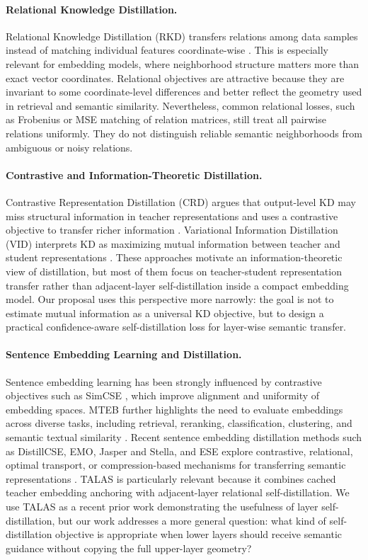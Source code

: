 \documentclass[letterpaper]{article}
\begin{document}
\paragraph{Relational Knowledge Distillation.}
Relational Knowledge Distillation (RKD) transfers relations among data samples instead of matching individual features coordinate-wise \cite{park2019relational}. This is especially relevant for embedding models, where neighborhood structure matters more than exact vector coordinates. Relational objectives are attractive because they are invariant to some coordinate-level differences and better reflect the geometry used in retrieval and semantic similarity. Nevertheless, common relational losses, such as Frobenius or MSE matching of relation matrices, still treat all pairwise relations uniformly. They do not distinguish reliable semantic neighborhoods from ambiguous or noisy relations.

\paragraph{Contrastive and Information-Theoretic Distillation.}
Contrastive Representation Distillation (CRD) argues that output-level KD may miss structural information in teacher representations and uses a contrastive objective to transfer richer information \cite{tian2019crd}. Variational Information Distillation (VID) interprets KD as maximizing mutual information between teacher and student representations \cite{ahn2019vid}. These approaches motivate an information-theoretic view of distillation, but most of them focus on teacher-student representation transfer rather than adjacent-layer self-distillation inside a compact embedding model. Our proposal uses this perspective more narrowly: the goal is not to estimate mutual information as a universal KD objective, but to design a practical confidence-aware self-distillation loss for layer-wise semantic transfer.

\paragraph{Sentence Embedding Learning and Distillation.}
Sentence embedding learning has been strongly influenced by contrastive objectives such as SimCSE \cite{gao2021simcse}, which improve alignment and uniformity of embedding spaces. MTEB further highlights the need to evaluate embeddings across diverse tasks, including retrieval, reranking, classification, clustering, and semantic textual similarity \cite{muennighoff2023mteb}. Recent sentence embedding distillation methods such as DistillCSE, EMO, Jasper and Stella, and ESE explore contrastive, relational, optimal transport, or compression-based mechanisms for transferring semantic representations \cite{xu2023distillcse,truong2025emo,zhang2025jasper,li2025ese}. TALAS is particularly relevant because it combines cached teacher embedding anchoring with adjacent-layer relational self-distillation. We use TALAS as a recent prior work demonstrating the usefulness of layer self-distillation, but our work addresses a more general question: what kind of self-distillation objective is appropriate when lower layers should receive semantic guidance without copying the full upper-layer geometry?
\end{document}

